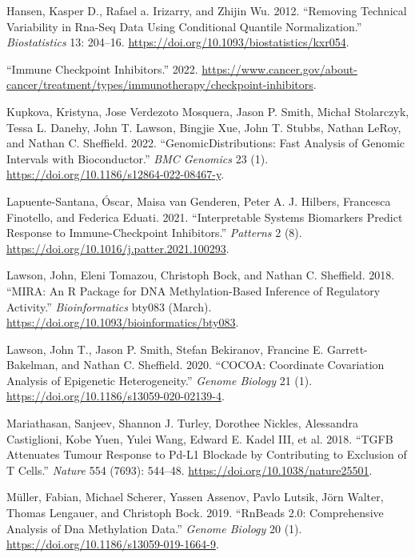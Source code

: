 \begin{cslreferences}
\leavevmode\hypertarget{ref-Hansen2012}{}%
Hansen, Kasper D., Rafael a. Irizarry, and Zhijin Wu. 2012. ``Removing Technical Variability in Rna-Seq Data Using Conditional Quantile Normalization.'' \emph{Biostatistics} 13: 204--16. \url{https://doi.org/10.1093/biostatistics/kxr054}.

\leavevmode\hypertarget{ref-ICBnci}{}%
``Immune Checkpoint Inhibitors.'' 2022. \url{https://www.cancer.gov/about-cancer/treatment/types/immunotherapy/checkpoint-inhibitors}.

\leavevmode\hypertarget{ref-Kupkova2022}{}%
Kupkova, Kristyna, Jose Verdezoto Mosquera, Jason P. Smith, Michał Stolarczyk, Tessa L. Danehy, John T. Lawson, Bingjie Xue, John T. Stubbs, Nathan LeRoy, and Nathan C. Sheffield. 2022. ``GenomicDistributions: Fast Analysis of Genomic Intervals with Bioconductor.'' \emph{BMC Genomics} 23 (1). \url{https://doi.org/10.1186/s12864-022-08467-y}.

\leavevmode\hypertarget{ref-easierPap}{}%
Lapuente-Santana, Óscar, Maisa van Genderen, Peter A. J. Hilbers, Francesca Finotello, and Federica Eduati. 2021. ``Interpretable Systems Biomarkers Predict Response to Immune-Checkpoint Inhibitors.'' \emph{Patterns} 2 (8). \url{https://doi.org/10.1016/j.patter.2021.100293}.

\leavevmode\hypertarget{ref-Lawson2018}{}%
Lawson, John, Eleni Tomazou, Christoph Bock, and Nathan C. Sheffield. 2018. ``MIRA: An R Package for DNA Methylation-Based Inference of Regulatory Activity.'' \emph{Bioinformatics} bty083 (March). \url{https://doi.org/10.1093/bioinformatics/bty083}.

\leavevmode\hypertarget{ref-Lawson2020}{}%
Lawson, John T., Jason P. Smith, Stefan Bekiranov, Francine E. Garrett-Bakelman, and Nathan C. Sheffield. 2020. ``COCOA: Coordinate Covariation Analysis of Epigenetic Heterogeneity.'' \emph{Genome Biology} 21 (1). \url{https://doi.org/10.1186/s13059-020-02139-4}.

\leavevmode\hypertarget{ref-Mariathasan2018}{}%
Mariathasan, Sanjeev, Shannon J. Turley, Dorothee Nickles, Alessandra Castiglioni, Kobe Yuen, Yulei Wang, Edward E. Kadel III, et al. 2018. ``TGFB Attenuates Tumour Response to Pd-L1 Blockade by Contributing to Exclusion of T Cells.'' \emph{Nature} 554 (7693): 544--48. \url{https://doi.org/10.1038/nature25501}.

\leavevmode\hypertarget{ref-Mueller2019}{}%
Müller, Fabian, Michael Scherer, Yassen Assenov, Pavlo Lutsik, Jörn Walter, Thomas Lengauer, and Christoph Bock. 2019. ``RnBeads 2.0: Comprehensive Analysis of Dna Methylation Data.'' \emph{Genome Biology} 20 (1). \url{https://doi.org/10.1186/s13059-019-1664-9}.


\end{cslreferences}
